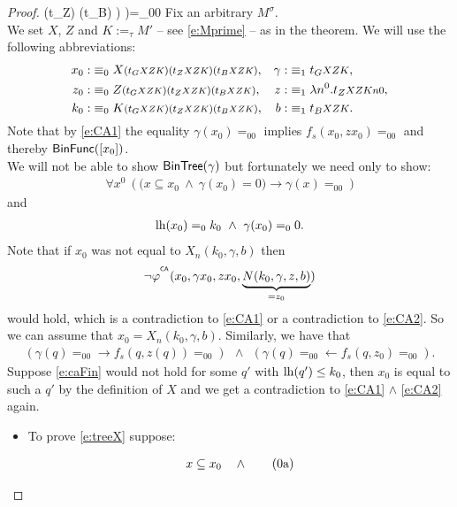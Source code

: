 \begin{proof}
{                    (t_Z)
                    (t_B)
                  }
               )
            )=_00
\ee
Fix an arbitrary $M^\sigma$.\\
We set $X$, $Z$ and $K:=_\tau M'$ -- see \eqref{e:Mprime} --
as in the theorem. We will use the following abbreviations:
\begin{align*}
x_0:&\equiv_0X\args{   (t_G\args{XZK}) (t_Z\args{XZK}) (t_B\args{XZK})  }, & 
\gamma:&\equiv_1t_G\args{XZK},\\
z_0:&\equiv_0Z\args{   (t_G\args{XZK}) (t_Z\args{XZK}) (t_B\args{XZK})  }, & 
z:&\equiv_1\lambda n^0. t_Z\args{XZKn0},\\
k_0:&\equiv_0K\args{   (t_G\args{XZK}) (t_Z\args{XZK}) (t_B\args{XZK})  }, & 
b:&\equiv_1t_B\args{XZK}.
\end{align*}
Note that by \eqref{e:CA1}
the equality $\gamma(x_0)=_00$ implies $f_s(x_0,zx_0)=_00$ and thereby 
$\textsf{\upshape BinFunc}([x_0])$.\\
We will not be able to show $\textsf{\upshape BinTree}(\gamma)$ but fortunately we need only
to show:
\begin{align}
\forall x^0 
\ \ \Big(\ \big( x\subseteq x_0 \ \wedge \ \gamma (x_0)=0 \big) \rightarrow  
\gamma(x)=_00 \ \Big) \label{e:treeX}
\end{align}
and
\begin{align}
    \operatorname{lh}(x_0)=_0 k_0 \ \wedge \ \gamma(x_0)=_00.
    \label{e:infX}
\end{align}
Note that if $x_0$ was not equal to $X_n(k_0,\gamma,b)$ then 
\[\neg \varphi^{^{\textsf{\upshape CA}}} (x_0, \gamma x_0, z x_0, 
\underbrace { N(k_0,\gamma, z, b) }_{ =z_0} ) \] would hold,
which is a contradiction to \eqref{e:CA1} or a contradiction to \eqref{e:CA2}.
So we can assume that $ x_0 = X_n(k_0,\gamma,b)$. Similarly, we have that
\begin{align}
      (\gamma (q) =_00 \rightarrow f_s( q, z(q) )=_00 )\ \ \wedge\ \ 
      (\gamma (q) =_00 \leftarrow  f_s( q, z_0  )=_00 )
\label{e:caFin}
\text{.}
\end{align}
Suppose \eqref{e:caFin} would not hold for some $q'$ with $\operatorname{lh}(q') 
\leq k_0$, then $x_0$ is equal to such 
a $q'$ by the definition of $X$ and we get a contradiction to \eqref{e:CA1} 
$\wedge$ \eqref{e:CA2} again.\\
\begin{itemize}
\item To prove \eqref{e:treeX} suppose:
\addtocounter{equation}{1}
\begin{align*}
&x\subseteq 
       x_0
      \quad \wedge \tag{\arabic{equation}a}\label{e:trAssX-A}\\

\end{align*}
\end{itemize}
\end{proof}
